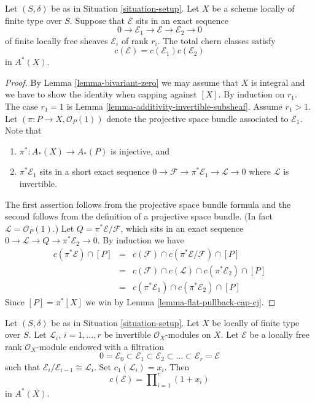 \begin{lemma}
\label{lemma-additivity-chern-classes}
Let $(S, \delta)$ be as in Situation \ref{situation-setup}.
Let $X$ be a scheme locally of finite type over $S$.
Suppose that ${\mathcal E}$ sits in an
exact sequence
$$
0
\to
{\mathcal E}_1
\to
{\mathcal E}
\to
{\mathcal E}_2
\to
0
$$
of finite locally free sheaves $\mathcal{E}_i$ of rank $r_i$.
The total chern classes satisfy
$$
c({\mathcal E}) = c({\mathcal E}_1) c({\mathcal E}_2)
$$
in $A^*(X)$.
\end{lemma}

\begin{proof}
By Lemma \ref{lemma-bivariant-zero} we may assume that $X$ is integral
and we have to show the identity when capping against $[X]$.
By induction on $r_1$. The case $r_1 = 1$ is
Lemma \ref{lemma-additivity-invertible-subsheaf}.
Assume $r_1 > 1$. Let $(\pi : P \to X, \mathcal{O}_P(1))$
denote the projective space bundle associated to $\mathcal{E}_1$. Note that
\begin{enumerate}
\item $\pi^* : A_*(X) \to A_*(P)$ is injective, and
\item $\pi^*\mathcal{E}_1$ sits in a short exact sequence
$0 \to \mathcal{F} \to \pi^*\mathcal{E}_1 \to \mathcal{L} \to 0$
where $\mathcal{L}$ is invertible.
\end{enumerate}
The first assertion follows from the projective space bundle formula
and the second follows from the definition of a projective space bundle.
(In fact $\mathcal{L} = \mathcal{O}_P(1)$.)
Let $Q = \pi^*\mathcal{E}/\mathcal{F}$, which sits in an
exact sequence $0 \to \mathcal{L} \to Q \to \pi^*\mathcal{E}_2 \to 0$.
By induction we have
\begin{eqnarray*}
c(\pi^*\mathcal{E}) \cap [P]
& = &
c(\mathcal{F}) \cap c(\pi^*\mathcal{E}/\mathcal{F}) \cap [P] \\
& = &
c(\mathcal{F}) \cap c(\mathcal{L}) \cap c(\pi^*\mathcal{E}_2) \cap [P] \\
& = &
c(\pi^*\mathcal{E}_1) \cap c(\pi^*\mathcal{E}_2) \cap [P]
\end{eqnarray*}
Since $[P] = \pi^*[X]$ we
win by Lemma \ref{lemma-flat-pullback-cap-cj}.
\end{proof}

\begin{lemma}
\label{lemma-chern-filter-by-linebundles}
Let $(S, \delta)$ be as in Situation \ref{situation-setup}.
Let $X$ be locally of finite type over $S$.
Let ${\mathcal L}_i$, $i = 1, \ldots, r$ be invertible
$\mathcal{O}_X$-modules on $X$.
Let $\mathcal{E}$ be a locally free rank
$\mathcal{O}_X$-module endowed with a filtration
$$
0 = \mathcal{E}_0 \subset \mathcal{E}_1 \subset \mathcal{E}_2
\subset \ldots \subset \mathcal{E}_r = \mathcal{E}
$$
such that $\mathcal{E}_i/\mathcal{E}_{i - 1} \cong \mathcal{L}_i$.
Set $c_1({\mathcal L}_i) = x_i$. Then
$$
c(\mathcal{E})
=
\prod\nolimits_{i = 1}^r (1 + x_i)
$$
in $A^*(X)$.
\end{lemma}

